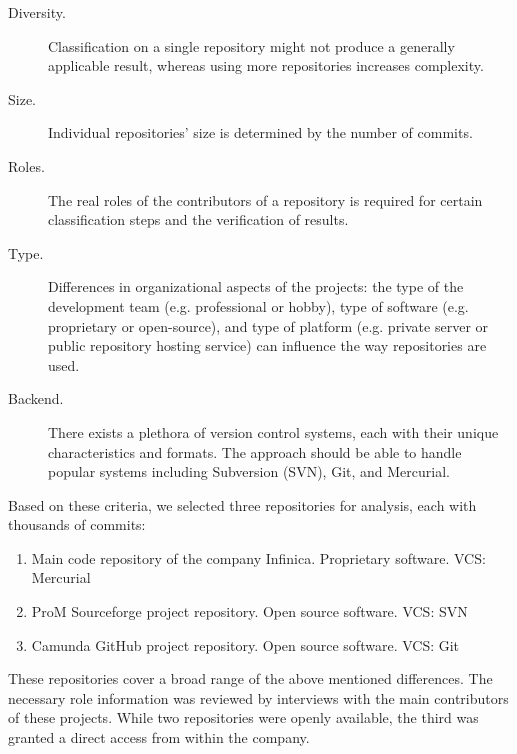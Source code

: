 \begin{description}

\item[Diversity.] Classification on a single repository might not produce a generally applicable result, whereas using more repositories increases complexity.

\item[Size.] Individual repositories' size is determined by the number of commits.

\item[Roles.] The real roles of the contributors of a repository is required for certain classification steps and the verification of results.

\item[Type.] Differences in organizational aspects of the projects: the type of the development team (e.g. professional or hobby), type of software (e.g. proprietary or open-source), and type of platform (e.g. private server or public repository hosting service) can influence the way repositories are used.

\item[Backend.] There exists a plethora of version control systems, each with their unique characteristics and formats. The approach should be able to handle popular systems including Subversion (SVN), Git, and Mercurial.

\end{description}

Based on these criteria, we selected three repositories for analysis, each with thousands of commits:

\begin{enumerate}

\item Main code repository of the company Infinica. Proprietary software. VCS: Mercurial

\item ProM Sourceforge project repository. Open source software. VCS: SVN

\item Camunda GitHub project repository. Open source software. VCS: Git

\end{enumerate}


These repositories cover a broad range of the above mentioned differences. The necessary role information was reviewed by interviews with the main contributors of these projects. While two repositories were openly available, the third was granted a direct access from within the company.

